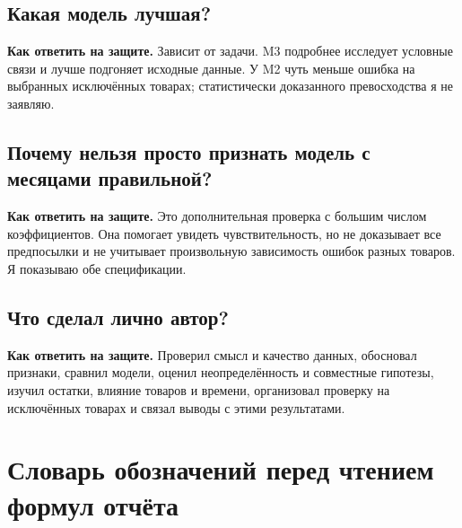 \documentclass[12pt,a4paper]{article}
\newcommand{\answer}[1]{\par\textbf{Как ответить на защите.} #1\par}
\begin{document}
\subsection*{Какая модель лучшая?}
\answer{Зависит от задачи. M3 подробнее исследует условные связи и лучше подгоняет исходные данные. У M2 чуть меньше ошибка на выбранных исключённых товарах; статистически доказанного превосходства я не заявляю.}

\subsection*{Почему нельзя просто признать модель с месяцами правильной?}
\answer{Это дополнительная проверка с большим числом коэффициентов. Она помогает увидеть чувствительность, но не доказывает все предпосылки и не учитывает произвольную зависимость ошибок разных товаров. Я показываю обе спецификации.}

\subsection*{Что сделал лично автор?}
\answer{Проверил смысл и качество данных, обосновал признаки, сравнил модели, оценил неопределённость и совместные гипотезы, изучил остатки, влияние товаров и времени, организовал проверку на исключённых товарах и связал выводы с этими результатами.}

\section{Словарь обозначений перед чтением формул отчёта}
\end{document}
